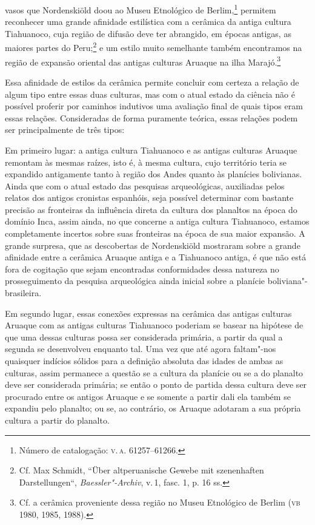 vasos que Nordenskiöld doou ao Museu Etnológico de Berlim,\footnote{Número
  de catalogação: \textsc{v.\,a.} 61257--61266.} permitem reconhecer uma grande
afinidade estilística com a cerâmica da antiga cultura Tiahuanoco, cuja
região de difusão deve ter abrangido, em épocas antigas, as maiores
partes do Peru;\footnote{Cf. Max Schmidt, ``Über altperuanische Gewebe
  mit szenenhaften Darstellungen``, \emph{Baessler"-Archiv}, v.\,1, fasc.
  1, p. 16 ss.} e um estilo muito semelhante também encontramos na
região de expansão oriental das antigas culturas Aruaque na ilha
Marajó.\footnote{Cf. a cerâmica proveniente dessa região no Museu
  Etnológico de Berlim (\textsc{vb} 1980, 1985, 1988).}

Essa afinidade de estilos da cerâmica permite concluir com certeza a
relação de algum tipo entre essas duas culturas, mas com o atual estado
da ciência não é possível proferir por caminhos indutivos uma avaliação
final de quais tipos eram essas relações. Consideradas de forma
puramente teórica, essas relações podem ser principalmente de três
tipos:

Em primeiro lugar: a antiga cultura Tiahuanoco e as antigas culturas
Aruaque remontam às mesmas raízes, isto é, à mesma cultura, cujo
território teria se expandido antigamente tanto à região dos Andes
quanto às planícies bolivianas. Ainda que com o atual estado das
pesquisas arqueológicas, auxiliadas pelos relatos dos antigos cronistas
espanhóis, seja possível determinar com bastante precisão as fronteiras
da influência direta da cultura dos planaltos na época do domínio Inca,
assim ainda, no que concerne a antiga cultura Tiahuanoco, estamos
completamente incertos sobre suas fronteiras na época de sua maior
expansão. A grande surpresa, que as descobertas de Nordenskiöld
mostraram sobre a grande afinidade entre a cerâmica Aruaque antiga e a
Tiahuanoco antiga, é que não está fora de cogitação que sejam
encontradas conformidades dessa natureza no prosseguimento da pesquisa
arqueológica ainda inicial sobre a planície boliviana"-brasileira.

Em segundo lugar, essas conexões expressas na cerâmica das antigas
culturas Aruaque com as antigas culturas Tiahuanoco poderiam se basear
na hipótese de que uma dessas culturas possa ser considerada primária,
a partir da qual a segunda se desenvolveu enquanto tal. Uma vez que até
agora faltam"-nos quaisquer indícios sólidos para a definição absoluta
das idades de ambas as culturas, assim permanece a questão se a cultura
da planície ou se a do planalto deve ser considerada primária; se então
o ponto de partida dessa cultura deve ser procurado entre os antigos
Aruaque e se somente a partir dali ela também se expandiu pelo planalto;
ou se, ao contrário, os Aruaque adotaram a sua própria cultura a partir
do planalto.

